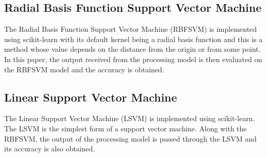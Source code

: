\documentclass[conference]{IEEEtran}
\begin{document}
\subsection{Radial Basis Function Support Vector Machine}

The Radial Basis Function Support Vector Machine (RBFSVM) is implemented using scikit-learn with its default kernel being a radial basis function and this is a method whose value depends on the distance from the origin or from some point. In this paper, the output received from the processing model is then evaluated on the RBFSVM model and the accuracy is obtained.

\subsection{Linear Support Vector Machine}

The Linear Support Vector Machine (LSVM) is implemented using scikit-learn. The LSVM is the simplest form of a support vector machine. Along with the RBFSVM, the output of the processing model is passed through the LSVM and its accuracy is also obtained.
%
%
%
%
%
%
%
%
%
\end{document}
